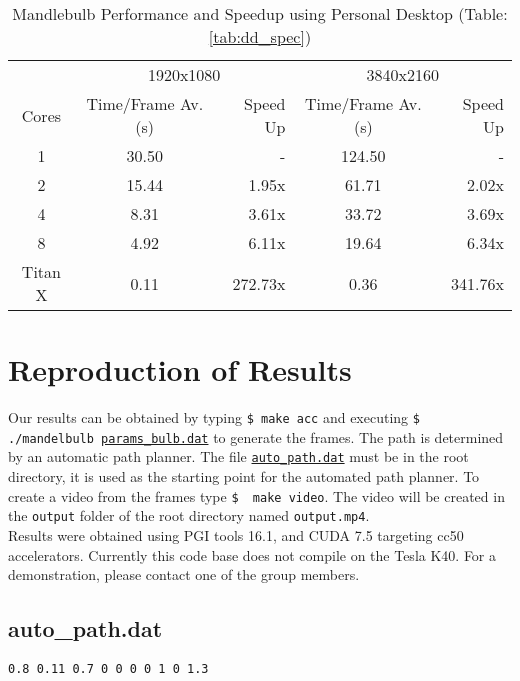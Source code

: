 \documentclass[]{article}
\begin{document}
\begin{table}[h!]
\centering
\begin{tabular}{|c|c|r|c|r|} \hline
& \multicolumn{2}{c|}{1920x1080} & \multicolumn{2}{c|}{3840x2160} \\ \cline{2-5}
Cores & Time/Frame Av. (s)  & Speed Up & Time/Frame Av. (s) & Speed Up \\ 
\hline
1 & 30.50 & - & 124.50 & -\\
2 & 15.44 & 1.95x & 61.71  & 2.02x \\
4 & 8.31  & 3.61x & 33.72  & 3.69x\\
8 & 4.92  & 6.11x & 19.64  & 6.34x\\ 
\hline
Titan X & 0.11 & 272.73x & 0.36 & 341.76x\\ \hline
\end{tabular}
\caption{Mandlebulb Performance and Speedup using Personal Desktop (Table: \ref{tab:dd_spec}) }
\end{table}

\section{Reproduction of Results}
Our results can be obtained by typing \texttt{\$ make acc} and executing \texttt{\$ ./mandelbulb \hyperref[subsec:params_bulb]{params\_bulb.dat}} to generate the frames. The path is determined by an automatic path planner. The file \texttt{\hyperref[subsec:auto_path]{auto\_path.dat}} must be in the root directory, it is used as the starting point for the automated path planner. To create a video from the frames type \texttt{\$~ make video}. The video will be created in the \texttt{output} folder of the root directory named \texttt{output.mp4}.\\
\newline
Results were obtained using PGI tools 16.1, and CUDA 7.5 targeting cc50 accelerators.  Currently this code base does not compile on the Tesla K40.  For a demonstration, please contact one of the group members.

\subsection{auto\_path.dat}\label{subsec:auto_path}
\begin{Verbatim}[fontsize= \footnotesize, tabsize=4]
0.8 0.11 0.7 0 0 0 0 1 0 1.3
\end{Verbatim}
\end{document}
